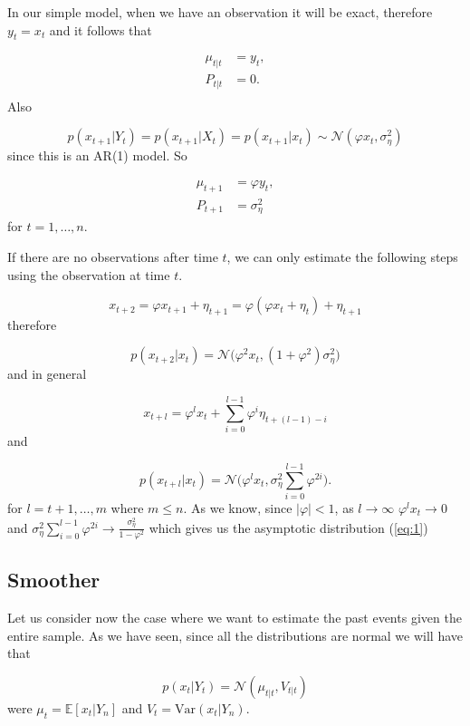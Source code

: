 \documentclass[11pt,a4paper]{article}
\newcommand{\E}{\mathbb{E}}
\newcommand{\var}{\mathrm{Var}}
\begin{document}
{\color{blue} In our simple model, when we have an observation it will be exact, therefore $y_t = x_t$ and it follows that

\begin{align*}
    \mu_{t|t} &= y_t,\\
    P_{t|t} &= 0.\\
\end{align*}
Also 

\begin{equation} \label{eq:2}
    p(x_{t+1} | Y_t) = p(x_{t+1} | X_t) = p(x_{t+1} | x_t) \sim \mathcal{N}(\varphi x_t, \sigma^2_\eta)
\end{equation}
since this is an AR(1) model. So

\begin{align*}
    \mu_{t+1} &= \varphi y_t,\\
    P_{t+1} &= \sigma^2_\eta
\end{align*}
for $t = 1, \dots, n$.

If there are no observations after time $t$, we can only estimate the following steps using the observation at time $t$.

\[
    x_{t+2} = \varphi x_{t+1} + \eta_{t+1} = \varphi (\varphi x_t + \eta_t) + \eta_{t+1}
\]
therefore

\[
    p(x_{t+2}| x_{t}) = \mathcal{N} \Big( \varphi^2 x_t, (1 + \varphi^2)\sigma^2_\eta \Big)
\]
and in general

\[
x_{t+l} = \varphi^l x_t + \sum_{i=0}^{l-1} \varphi^i \eta_{t+(l-1)-i}
\]
and

\[
    p(x_{t+l}| x_{t}) = \mathcal{N} \Bigg( \varphi^l x_t, \sigma^2_\eta \sum_{i=0}^{l-1} \varphi^{2i} \Bigg).
\]
for $l = t+1, \dots, m$ where $m \leq n$. As we know, since $|\varphi| < 1$, as $l \rightarrow \infty $ $\varphi^l x_t \rightarrow 0$ and $\sigma^2_\eta \sum_{i=0}^{l-1} \varphi^{2i} \rightarrow \frac{\sigma^2_\eta}{1-\varphi^2}$ which gives us the asymptotic distribution (\ref{eq:1})


}

\subsection{Smoother}

Let us consider now the case where we want to estimate the past events given the entire sample.
As we have seen, since all the distributions are normal we will have that 

\[
    p(x_t | Y_t) = \mathcal{N}(\mu_{t|t}, V_{t|t})
\]
were $\mu_t = \E[x_t | Y_n]$ and $V_t = \var(x_t | Y_n)$.
\end{document}
